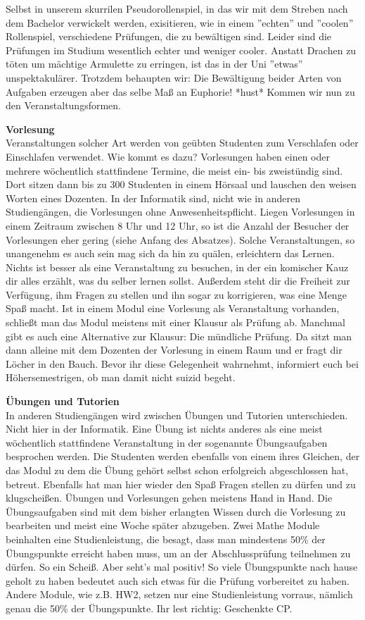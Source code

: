 Selbst in unserem skurrilen Pseudorollenspiel, in das wir mit dem Streben nach dem Bachelor verwickelt werden, exisitieren, wie in einem ''echten'' und ''coolen'' Rollenspiel, verschiedene Prüfungen, die zu bewältigen sind. Leider sind die Prüfungen im Studium wesentlich echter und weniger cooler. Anstatt Drachen zu töten um mächtige Armulette zu erringen, ist das in der Uni ''etwas'' unspektakulärer. Trotzdem behaupten wir: Die Bewältigung beider Arten von Aufgaben erzeugen aber das selbe Maß an Euphorie! *hust* 
Kommen wir nun zu den Veranstaltungsformen.

\textbf{Vorlesung}\\
Veranstaltungen solcher Art werden von geübten Studenten zum Verschlafen oder Einschlafen verwendet. Wie kommt es dazu? Vorlesungen haben einen oder mehrere wöchentlich stattfindene Termine, die meist ein- bis zweistündig sind. Dort sitzen dann bis zu 300 Studenten in einem Hörsaal und lauschen den weisen Worten eines Dozenten. In der Informatik sind, nicht wie in anderen Studiengängen, die Vorlesungen ohne Anwesenheitspflicht. Liegen Vorlesungen in einem Zeitraum zwischen 8 Uhr und 12 Uhr, so ist die Anzahl der Besucher der Vorlesungen eher gering (siehe Anfang des Absatzes). Solche Veranstaltungen, so unangenehm es auch sein mag sich da hin zu quälen, erleichtern das Lernen. Nichts ist besser als eine Veranstaltung zu besuchen, in der ein komischer Kauz dir alles erzählt, was du selber lernen sollst. Außerdem steht dir die Freiheit zur Verfügung, ihm Fragen zu stellen und ihn sogar zu korrigieren, was eine Menge Spaß macht. Ist in einem Modul eine Vorlesung als Veranstaltung vorhanden, schließt man das Modul meistens mit einer Klausur als Prüfung ab. Manchmal gibt es auch eine Alternative zur Klausur: Die mündliche Prüfung. Da sitzt man dann alleine mit dem Dozenten der Vorlesung in einem Raum und er fragt dir Löcher in den Bauch. Bevor ihr diese Gelegenheit wahrnehmt, informiert euch bei Höhersemestrigen, ob man damit nicht suizid begeht.

\textbf{Übungen und Tutorien}\\
In anderen Studiengängen wird zwischen Übungen und Tutorien unterschieden. Nicht hier in der Informatik. Eine Übung ist nichts anderes als eine meist wöchentlich stattfindene Veranstaltung in der sogenannte Übungsaufgaben besprochen werden. Die Studenten werden ebenfalls von einem ihres Gleichen, der das Modul zu dem die Übung gehört selbst schon erfolgreich abgeschlossen hat, betreut. Ebenfalls hat man hier wieder den Spaß Fragen stellen zu dürfen und zu klugscheißen. Übungen und Vorlesungen gehen meistens Hand in Hand. Die Übungsaufgaben sind mit dem bisher erlangten Wissen durch die Vorlesung zu bearbeiten und meist eine Woche später abzugeben. Zwei Mathe Module beinhalten eine Studienleistung, die besagt, dass man mindestens 50\% der Übungspunkte erreicht haben muss, um an der Abschlussprüfung teilnehmen zu dürfen. So ein Scheiß. Aber seht's mal positiv! So viele Übungspunkte nach hause geholt zu haben bedeutet auch sich etwas für die Prüfung vorbereitet zu haben. Andere Module, wie z.B. HW2, setzen nur eine Studienleistung vorraus, nämlich genau die 50\% der Übungspunkte. Ihr lest richtig: Geschenkte CP.

